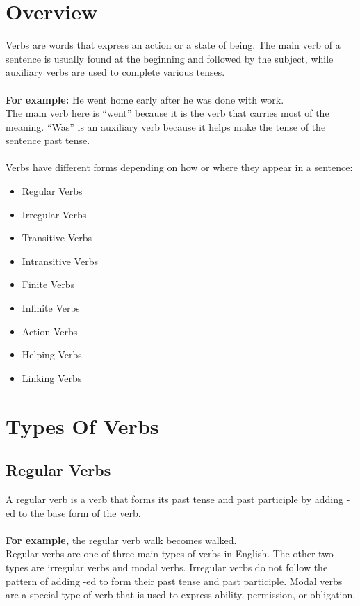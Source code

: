\chapter{Overview}
Verbs are words that express an action or a state of being. The main verb of a sentence is usually found at the beginning and followed by the subject, while auxiliary verbs are used to complete various tenses.\\\\
\textbf{For example:} He went home early after he was done with work.\\
The main verb here is “went” because it is the verb that carries most of the meaning. “Was” is an auxiliary verb because it helps make the tense of the sentence past tense.\\\\
Verbs have different forms depending on how or where they appear in a sentence:
\begin{itemize}
    \item Regular Verbs
    \item Irregular Verbs
    \item Transitive Verbs
    \item Intransitive Verbs
    \item Finite Verbs
    \item Infinite Verbs
    \item Action Verbs
    \item Helping Verbs
    \item Linking Verbs
\end{itemize}

\chapter{Types Of Verbs}
\section{Regular Verbs}
A regular verb is a verb that forms its past tense and past participle by adding -ed to the base form of the verb.\\\\
\textbf{For example,} the regular verb walk becomes walked.\\
Regular verbs are one of three main types of verbs in English. The other two types are irregular verbs and modal verbs. Irregular verbs do not follow the pattern of adding -ed to form their past tense and past participle. Modal verbs are a special type of verb that is used to express ability, permission, or obligation.

